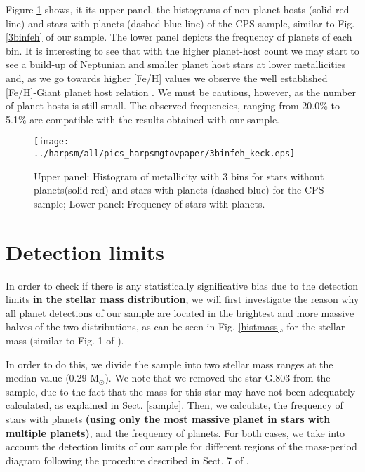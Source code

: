 \documentclass[structabstract]{aa}
\begin{document}
Figure \ref{3feh:keck} shows, it its upper panel, the histograms of non-planet hosts (solid red line) and stars with planets (dashed blue line) of the CPS sample, similar to Fig. \ref{3binfeh} of our sample. The lower panel depicts the frequency of planets of each bin. It is interesting to see that with the higher planet-host count we may start to see a build-up of Neptunian and smaller planet host stars at lower metallicities and, as we go towards higher [Fe/H] values we observe the well established [Fe/H]-Giant planet host relation \citep[e.g.][]{Santos-2004b,Fischer-2005}. We must be cautious, however, as the number of planet hosts is still small. The observed frequencies, ranging from 20.0\% to 5.1\% are compatible with the results obtained with our sample.

\begin{figure}[h]
\begin{center}
\texttt{[image: ../harpsm/all/pics\_harpsmgtovpaper/3binfeh\_keck.eps]}
\end{center}
\caption{Upper panel: Histogram of metallicity with 3 bins for stars without planets(solid red) and stars with planets (dashed blue) for the CPS sample; Lower panel: Frequency of stars with planets.}
\label{3feh:keck}
\end{figure}



\section{Detection limits}
\label{dl}

In order to check if there is any statistically significative bias due to the detection limits \textbf{in the stellar mass distribution}, we will first investigate the reason why all planet detections of our sample are located in the brightest and more massive halves of the two distributions, as can be seen in Fig. \ref{histmass}, for the stellar mass (similar to Fig. 1 of \citet{Bonfils-2011}).

In order to do this, we divide the sample into two stellar mass ranges at the median value (0.29 M$_{\odot}$). We note that we removed the star Gl803 from the sample, due to the fact that the mass for this star may have not been adequately calculated, as explained in Sect. \ref{sample}. Then, we calculate, the frequency of stars with planets \textbf{(using only the most massive planet in stars with multiple planets)}, and the frequency of planets. For both cases, we take into account the detection limits of our sample for different regions of the mass-period diagram following the procedure described in Sect. 7 of \citet{Bonfils-2011}. 
\end{document}
